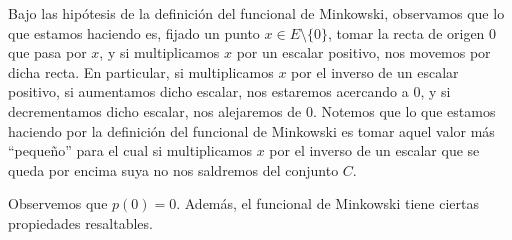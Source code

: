 \begin{observacion}
    Bajo las hipótesis de la definición del funcional de Minkowski, observamos que lo que estamos haciendo es, fijado un punto $x\in E\setminus \{0\}$, tomar la recta de origen $0$ que pasa por $x$, y si multiplicamos $x$ por un escalar positivo, nos movemos por dicha recta. En particular, si multiplicamos $x$ por el inverso de un escalar positivo, si aumentamos dicho escalar, nos estaremos acercando a $0$, y si decrementamos dicho escalar, nos alejaremos de $0$. Notemos que lo que estamos haciendo por la definición del funcional de Minkowski es tomar aquel valor más ``pequeño'' para el cual si multiplicamos $x$ por el inverso de un escalar que se queda por encima suya no nos saldremos del conjunto $C$.
    \begin{figure}[H]
        \centering
    \end{figure}
\end{observacion}

Observemos que $p(0) = 0$. Además, el funcional de Minkowski tiene ciertas propiedades resaltables.


